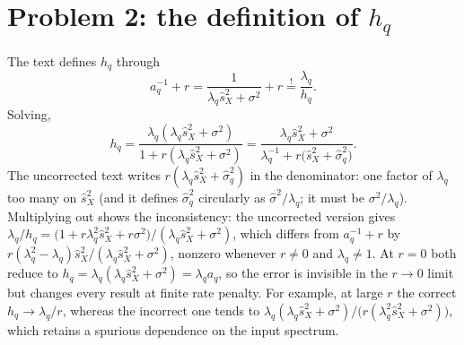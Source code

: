 \documentclass[11pt,a4paper]{article}
\begin{document}
\section{\texorpdfstring{Problem 2: the definition of $h_q$}{Problem 2: the definition of h\_q}}
The text defines $h_q$ through
\begin{equation}
  a_q^{-1} + r = \frac{1}{\lambda_q\hat s_X^2 + \sigma^2} + r \overset{!}{=} \frac{\lambda_q}{h_q}.
\end{equation}
Solving,
\begin{equation}
  h_q = \frac{\lambda_q(\lambda_q\hat s_X^2 + \sigma^2)}{1 + r(\lambda_q\hat s_X^2+\sigma^2)}
      = \frac{\lambda_q\hat s_X^2 + \sigma^2}{\lambda_q^{-1} + r\big(\hat s_X^2 + \hat\sigma_q^2\big)} .
  \label{eq:hq}
\end{equation}
The uncorrected text writes $r(\lambda_q\hat s_X^2 + \hat\sigma_q^2)$ in the denominator: one factor of $\lambda_q$ too many on $\hat s_X^2$ (and it defines $\hat\sigma_q^2$ circularly as $\hat\sigma^2/\lambda_q$; it must be $\sigma^2/\lambda_q$).
Multiplying out shows the inconsistency: the uncorrected version gives
$\lambda_q/h_q = \big(1 + r\lambda_q^2\hat s_X^2 + r\sigma^2\big)/(\lambda_q\hat s_X^2+\sigma^2)$, which differs from $a_q^{-1}+r$ by $r(\lambda_q^2-\lambda_q)\hat s_X^2/(\lambda_q\hat s_X^2+\sigma^2)$, nonzero whenever $r\neq0$ and $\lambda_q\neq1$.
At $r = 0$ both reduce to $h_q = \lambda_q(\lambda_q\hat s_X^2+\sigma^2) = \lambda_q a_q$, so the error is invisible in the $r\to0$ limit but changes every result at finite rate penalty. For example, at large $r$ the correct $h_q \to \lambda_q/r$, whereas the incorrect one tends to $\lambda_q(\lambda_q\hat s_X^2+\sigma^2)/\big(r(\lambda_q^2\hat s_X^2+\sigma^2)\big)$, which retains a spurious dependence on the input spectrum.
\end{document}
